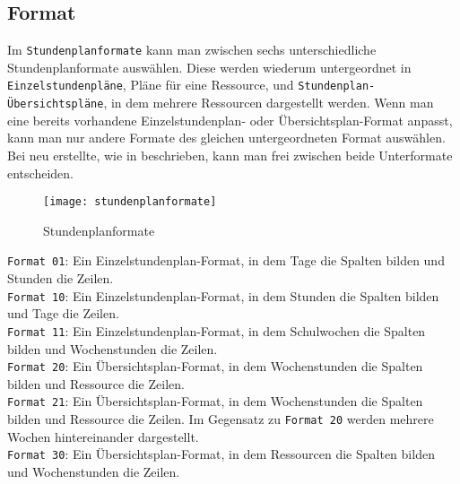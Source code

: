 \vspace{20pt}

\subsection{Format}

\noindent
Im \texttt{Stundenplanformate} kann man zwischen sechs unterschiedliche Stundenplanformate auswählen. Diese werden wiederum untergeordnet in \texttt{Einzelstundenpläne}, Pläne für eine Ressource, und \texttt{Stundenplan-Übersichtspläne}, in dem mehrere Ressourcen dargestellt werden. Wenn man eine bereits vorhandene Einzelstundenplan- oder Übersichtsplan-Format anpasst, kann man nur andere Formate des gleichen untergeordneten Format auswählen. Bei neu erstellte, wie in  beschrieben, kann man frei zwischen beide Unterformate entscheiden.\\

\newpage

\begin{wrapfigure}{r}{0.4\textwidth}
	\vspace{-14pt}
	\centering
	\texttt{[image: stundenplanformate]}
	\vspace{-5pt}
	\caption{Stundenplanformate}
	\label{fig:stundenplanformate}
\end{wrapfigure}

\noindent
\texttt{Format 01}: Ein Einzelstundenplan-Format, in dem Tage die Spalten bilden und Stunden die Zeilen.\\

\noindent
\texttt{Format 10}: Ein Einzelstundenplan-Format, in dem Stunden die Spalten bilden und Tage die Zeilen.\\

\noindent
\texttt{Format 11}: Ein Einzelstundenplan-Format, in dem Schulwochen die Spalten bilden und Wochenstunden die Zeilen.\\

\noindent
\texttt{Format 20}: Ein Übersichtsplan-Format, in dem Wochenstunden die Spalten bilden und Ressource die Zeilen.\\

\noindent
\texttt{Format 21}: Ein Übersichtsplan-Format, in dem Wochenstunden die Spalten bilden und Ressource die Zeilen. Im Gegensatz zu \texttt{Format 20} werden mehrere Wochen hintereinander dargestellt.\\

\noindent
\texttt{Format 30}: Ein Übersichtsplan-Format, in dem Ressourcen die Spalten bilden und Wochenstunden die Zeilen.\\

